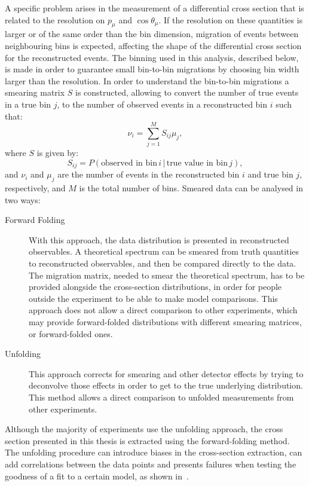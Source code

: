 A specific problem arises in the measurement of a differential cross section that is related to the resolution on $p_\mu$ and $\cos\theta_\mu$. If the resolution on these quantities is larger or of the same order than the bin dimension, migration of events between neighbouring bins is expected, affecting the shape of the differential cross section for the reconstructed events. The binning used in this analysis, described below, is made in order to guarantee small bin-to-bin migrations by choosing bin width larger than the resolution. In order to understand the bin-to-bin migrations a smearing matrix $S$ is constructed, allowing to convert the number of true events in a true bin $j$, to the number of observed events in a reconstructed bin $i$ such that:
\begin{equation}
\label{eq:smearing_matrix_2d}
\nu_i = \sum_{j=1}^{M} S_{ij} \mu_j,
\end{equation}
where $S$ is given by:
\begin{equation}
S_{ij} = P(\text{observed in bin}\, i \,|\, \text{true value in bin}\, j),
\end{equation}
and $\nu_i$ and $\mu_j$ are the number of events in the reconstructed bin $i$ and true bin $j$, respectively, and $M$ is the total number of bins.
Smeared data can be analysed in two ways: 
\begin{description}
\item[Forward Folding] With this approach, the data distribution is presented in reconstructed observables. A theoretical spectrum can be smeared from truth quantities to reconstructed observables, and then be compared directly to the data. The migration matrix, needed to smear the theoretical spectrum, has to be provided alongside the cross-section distributions, in order for people outside the experiment to be able to make model comparisons. This approach does not allow a direct comparison to other experiments, which may provide  forward-folded distributions with different smearing matrices, or forward-folded ones.
\item[Unfolding] This approach corrects for smearing and other detector effects by trying to deconvolve those effects in order to get to the true underlying distribution. This method allows a direct comparison to unfolded measurements from other experiments. 
\end{description}
Although the majority of experiments use the unfolding approach, the cross section presented in this thesis is extracted using the forward-folding method. The unfolding procedure can introduce biases in the cross-section extraction, can add correlations between the data points and presents failures when testing the goodness of a fit to a certain model, as shown in~\cite{forward_folding}.
